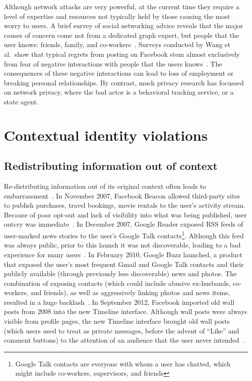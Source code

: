 \documentclass{llncs}
\begin{document}
\begin{comment}TODO: figure out how to cite this. Why is this short
paper's model worth pursuing? It's simpler, and focusses on the user rather
than data.
\end{comment}

Although network attacks are very powerful, at the current time they require a
level of expertise and resources not typically held by those causing the most
worry to users. A brief survey of social networking advice reveals that the
major causes of concern come not from a dedicated graph expert, but people that
the user knows: friends, family, and co-workers~\cite{fbtips2,fbtips1}.
Surveys conducted by Wang et al.~show that typical regrets from posting on
Facebook stem almost exclusively from fear of negative interactions with people
that the users knows~\cite{wang}. The consequences of these negative
interactions can lead to loss of employment or breaking personal relationships.
By contrast, much privacy research has focussed on network privacy, where the
bad actor is a behavioral tracking service, or a state agent.

\section{Contextual identity violations}
\label{sec:examples}
\subsection{Redistributing information out of context}
Re-distributing information out of its original context often leads to
embarrassment~\cite{nissenbaum}.  In November 2007, Facebook Beacon allowed
third-party sites to publish purchases, travel bookings, movie rentals to the
user's activity stream.  Because of poor opt-out and lack of visibility into
what was being published, user outcry was immediate~\cite{mccarthy,nakashima}.
In December 2007, Google Reader exposed RSS feeds of user-marked news stories
to the user's Google Talk contacts\footnote{Google Talk contacts are everyone
with whom a user has chatted, which might include co-workers, supervisors, and
friends}. Although this feed was always public, prior to this launch it was not
discoverable, leading to a bad experience for many users~\cite{helft}. In
February 2010, Google Buzz launched, a product that
exposed the user's most frequent Gmail and Google Talk contacts and their
publicly available (through previously less discoverable) news and photos.  The
combination of exposing contacts (which could include abusive ex-husbands,
co-workers, and friends), as well as aggressively linking photos and news
items, resulted in a huge backlash~\cite{fugitivus,buzz}. In September 2012,
Facebook imported old wall posts from 2008 into the new Timeline interface.
Although wall posts were always visible from profile pages, the new Timeline
interface brought old wall posts (which users used to treat as private
messages, before the advent of ``Like'' and comment buttons) to the attention
of an audience that the user never intended~\cite{timeline}.
\end{document}
